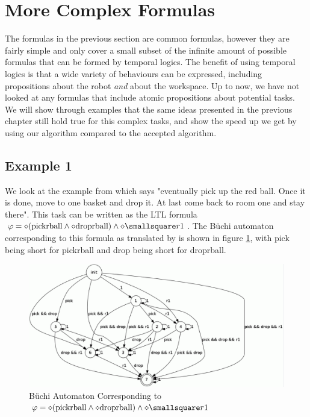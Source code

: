 \section{More Complex Formulas}
The formulas in the previous section are common formulas, however they are fairly simple and only cover a small subset of the infinite amount of possible formulas that can be formed by temporal logics. The benefit of using temporal logics is that a wide variety of behaviours can be expressed, including propositions about the robot \textit{and} about the workspace. Up to now, we have not looked at any formulas that include atomic propositions about potential tasks. We will show through examples that the same ideas presented in the previous chapter still hold true for this complex tasks, and show the speed up we get by using our algorithm compared to the accepted algorithm. 

\subsection{Example 1}
We look at the example from \cite{guo15} which says "eventually pick up the red ball. Once it is done, move to one basket and drop it. At last come back to room one and stay there". This task can be written as the LTL formula $\varphi = \diamond (\text{pickrball} \wedge \diamond \text{droprball}) \wedge \diamond \smallsquare r1$. The B\"uchi automaton corresponding to this formula as translated by \cite{gastin01} is shown in figure \ref{fig:buchiEx1}, with pick being short for pickrball and drop being short for droprball.

\begin{figure}[!htb]
\centering
\includegraphics[scale=0.4]{buchiEx1_1}
\caption{B\"uchi Automaton Corresponding to $\varphi = \diamond (\text{pickrball} \wedge \diamond \text{droprball}) \wedge \diamond \smallsquare r1$}
\label{fig:buchiEx1}
\end{figure} 

